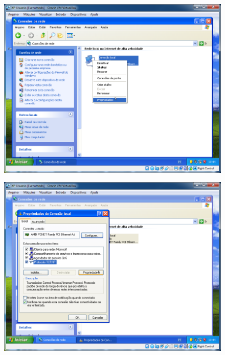 \documentclass[10pt]{article}
\begin{document}
\begin{figure}[H]
    \centering
    \caption{}
    \label{fig:5322}
    \includegraphics[width=\linewidth]{images/windows_server/dhcp/020.png}
\end{figure}
\begin{figure}[H]
    \centering
    \caption{}
    \label{fig:5323}
    \includegraphics[width=\linewidth]{images/windows_server/dhcp/022.png}
\end{figure}
\end{document}
